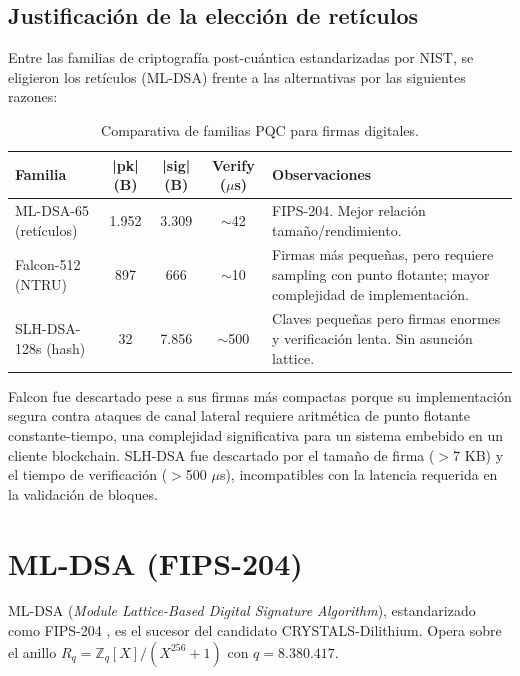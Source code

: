 \subsection{Justificación de la elección de retículos}

Entre las familias de criptografía post-cuántica estandarizadas por NIST, se eligieron los retículos (ML-DSA) frente a las alternativas por las siguientes razones:

\begin{table}[htbp]
\centering
\caption{Comparativa de familias PQC para firmas digitales.}
\label{tab:pqc_families}
\begin{tabular}{@{}lcccL{4.5cm}@{}}
\toprule
\textbf{Familia} & \textbf{|pk| (B)} & \textbf{|sig| (B)} & \textbf{Verify ($\mu$s)} & \textbf{Observaciones} \\
\midrule
ML-DSA-65 (retículos) & 1.952 & 3.309 & $\sim$42 & FIPS-204. Mejor relación tamaño/rendimiento. \\
Falcon-512 (NTRU) & 897 & 666 & $\sim$10 & Firmas más pequeñas, pero requiere sampling con punto flotante; mayor complejidad de implementación. \\
SLH-DSA-128s (hash) & 32 & 7.856 & $\sim$500 & Claves pequeñas pero firmas enormes y verificación lenta. Sin asunción lattice. \\
\bottomrule
\end{tabular}
\end{table}

Falcon fue descartado pese a sus firmas más compactas porque su implementación segura contra ataques de canal lateral requiere aritmética de punto flotante constante-tiempo, una complejidad significativa para un sistema embebido en un cliente blockchain. SLH-DSA fue descartado por el tamaño de firma ($>$7 KB) y el tiempo de verificación ($>$500 $\mu$s), incompatibles con la latencia requerida en la validación de bloques.


\section{ML-DSA (FIPS-204)}
\label{sec:mldsa}

ML-DSA (\emph{Module Lattice-Based Digital Signature Algorithm}), estandarizado como FIPS-204 \parencite{nistfips204}, es el sucesor del candidato CRYSTALS-Dilithium. Opera sobre el anillo $R_q = \mathbb{Z}_q[X]/(X^{256} + 1)$ con $q = 8.380.417$.

